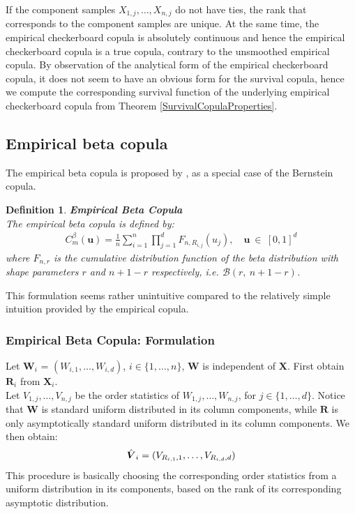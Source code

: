 \documentclass[12pt]{report}
\newtheorem{definition}{Definition}[subsection]
\newcommand{\1}{\mathbf{1}}
\begin{document}
\begin{flushleft}
If the component samples $X_{1,j}, \dots, X_{n,j}$ do not have ties, the rank that corresponds to the component samples are unique. At the same time, the empirical checkerboard copula is absolutely continuous and hence the empirical checkerboard copula is a true copula, contrary to the unsmoothed empirical copula. By observation of the analytical form of the empirical checkerboard copula, it does not seem to have an obvious form for the survival copula, hence we compute the corresponding survival function of the underlying empirical checkerboard copula from Theorem \ref{SurvivalCopulaProperties}.

\newpage
\subsection{Empirical beta copula}
\vspace{0.5cm}

The empirical beta copula is proposed by \cite{SegersEBC}, as a special case of the Bernstein copula.

\begin{definition}\label{EBCDef}
\textit{\normalfont\parencite{SegersEBC}} \:
\textbf{Empirical Beta Copula} \\
The empirical beta copula is defined by:
\begin{align*}
C^{\beta}_{m}(\textbf{u}) = \frac{1}{n} \sum\limits_{i = 1}^{n} \prod\limits_{j = 1}^{d} F_{n,R_{i,j}}(u_{j}), \quad \textbf{u} \: \in \: [0,1]^{d}
\end{align*}
where $F_{n,r}$ is the cumulative distribution function of the beta distribution with shape parameters $r$ and $n + 1 - r$ respectively, i.e. $\mathcal{B}(r, \:n + 1 - r)$.
\end{definition}

This formulation seems rather unintuitive compared to the relatively simple intuition provided by the empirical copula. \\

\subsubsection{Empirical Beta Copula: Formulation}
\vspace{0.5cm}
Let $\boldsymbol{W}_{i}$ = $(W_{i,1}, \dots, W_{i,d})$, \: $i \in \{1, \dots, n \}$, $\boldsymbol{W}$ is independent of $\boldsymbol{X}$. First obtain $\boldsymbol{R}_{i}$ from $\boldsymbol{X}_{i}$.\\
\vspace{0.5cm}
Let $V_{1,j}, \dots, V_{n,j}$ be the order statistics of $W_{1,j}, \dots, W_{n,j}$, for $j \in \{ 1, \dots, d \}$. Notice that $\boldsymbol{W}$ is standard uniform distributed in its column components, while $\textbf{R}$ is only asymptotically standard uniform distributed in its column components. We then obtain:
\begin{align*}
\Hat{\boldsymbol{V}}_{i} = (V_{R_{i,1},1}, \dots, V_{R_{i,d},d})    
\end{align*}
This procedure is basically choosing the corresponding order statistics from a uniform distribution in its components, based on the rank of its corresponding asymptotic distribution. 


\end{flushleft}
\end{document}
